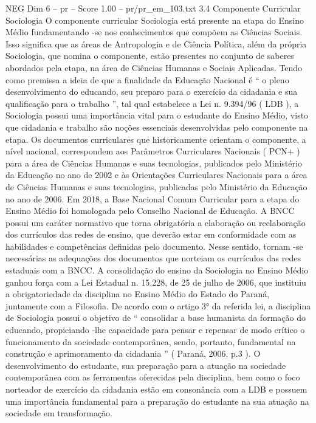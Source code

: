 \begin{textsample}{NEG Dim 6 – pr – Score 1.00 – pr/pr\_em\_103.txt}  \label{ex:f6_neg_262}
3.4 Componente Curricular Sociologia O componente curricular Sociologia está presente na etapa do Ensino Médio fundamentando -se nos conhecimentos que compõem as Ciências Sociais.
Isso significa que as áreas de Antropologia e de Ciência Política, além da própria Sociologia, que nomina o componente, estão presentes no conjunto de saberes abordados pela etapa, na área de Ciências Humanas e Sociais Aplicadas.
Tendo como premissa a ideia de que a finalidade da Educação Nacional é “ o pleno desenvolvimento do educando, seu preparo para o exercício da cidadania e sua qualificação para o trabalho ”, tal qual estabelece a Lei n. 9.394/96 ( LDB ), a Sociologia possui uma importância vital para o estudante do Ensino Médio, visto que cidadania e trabalho são noções essenciais desenvolvidas pelo componente na etapa.
Os documentos curriculares que historicamente orientam o componente, a nível nacional, correspondem aos Parâmetros Curriculares Nacionais ( PCN+ ) para a área de Ciências Humanas e suas tecnologias, publicados pelo Ministério da Educação no ano de 2002 e às Orientações Curriculares Nacionais para a área de Ciências Humanas e suas tecnologias, publicadas pelo Ministério da Educação no ano de 2006.
Em 2018, a Base Nacional Comum Curricular para a etapa do Ensino Médio foi homologada pelo Conselho Nacional de Educação.
A BNCC possui um caráter normativo que torna obrigatória a elaboração ou reelaboração dos currículos das redes de ensino, que deverão estar em conformidade com as habilidades e competências definidas pelo documento.
Nesse sentido, tornam -se necessárias as adequações dos documentos que norteiam os currículos das redes estaduais com a BNCC.
A consolidação do ensino da Sociologia no Ensino Médio ganhou força com a Lei Estadual n. 15.228, de 25 de julho de 2006, que instituiu a obrigatoriedade da disciplina no Ensino Médio do Estado do Paraná, juntamente com a Filosofia.
De acordo com o artigo 3{\EmojiFont °} da referida lei, a disciplina de Sociologia possui o objetivo de “ consolidar a base humanista da formação do educando, propiciando -lhe capacidade para pensar e repensar de modo crítico o funcionamento da sociedade contemporânea, sendo, portanto, fundamental na construção e aprimoramento da cidadania ” ( Paraná, 2006, p.3 ).
O desenvolvimento do estudante, sua preparação para a atuação na sociedade contemporânea com as ferramentas oferecidas pela disciplina, bem como o foco norteador de exercício da cidadania estão em consonância com a LDB e possuem uma importância fundamental para a preparação do estudante na sua atuação na sociedade em transformação.

\end{textsample}
